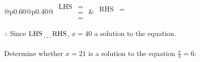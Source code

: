 \documentclass[12pt]{article}
\newcounter{minipagecount}
\begin{document}
\begin{multicols}{2}
\begin{minipage}[t]{0.40\textwidth}
    \noindent
    \renewcommand{\arraystretch}{1.3} %
    \begin{tabular}{@{}p{0.60\linewidth}@{}p{0.40\linewidth}@{}}
        \(\begin{aligned}
            \text{LHS} &=  \\
                    &=  \\
                    &= 
        \end{aligned}\) &
        \(\begin{aligned}
            \text{RHS} &= \\
                    & \\
                    &
        \end{aligned}\)
    \end{tabular}
    \renewcommand{\arraystretch}{1.0} %
    \vspace{2pt}  %

    \noindent \(\therefore\) Since \(\text{LHS} \dotuline{\hspace{5mm}} \text{RHS}\), \(x = 40\) \dotuline{\hspace{12mm}} a solution to the equation.

\end{minipage}

\vspace*{0.5ex}
\vfill{}
\columnbreak
\noindent{(\theminipagecount)}\hspace{0.1mm} %
\begin{minipage}[t]{0.40\textwidth} %

    \noindent Determine whether \(x = 21\) is a solution to the equation \(\frac{x}{4} = 6\):
    \vspace{2pt}  %


\end{minipage}
\end{multicols}
\end{document}
